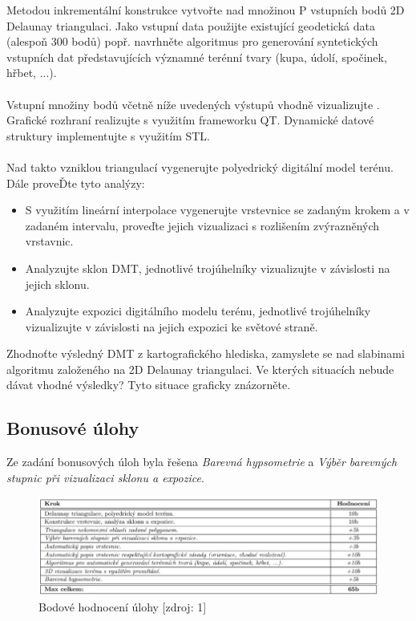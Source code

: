 \documentclass[a4paper, 12pt]{article}
\begin{document}
Metodou inkrementální konstrukce vytvořte nad množinou P vstupních bodů 2D Delaunay triangulaci. Jako vstupní data použijte existující geodetická data (alespoň 300 bodů) popř. navrhněte algoritmus pro generování syntetických vstupních dat představujících významné terénní tvary (kupa, údolí, spočinek, hřbet, ...).\\
\\
Vstupní množiny bodů včetně níže uvedených výstupů vhodně vizualizujte . Grafické rozhraní realizujte s využitím frameworku QT. Dynamické datové struktury implementujte s využitím STL. \\
\\
Nad takto vzniklou triangulací vygenerujte polyedrický digitální model terénu. Dále proveĎte tyto analýzy:
\\
\begin{itemize}
  \item S využitím lineární interpolace vygenerujte vrstevnice se zadaným krokem a v zadaném intervalu, proveďte jejich vizualizaci s rozlišením zvýrazněných vrstavnic.
  \item Analyzujte sklon DMT, jednotlivé trojúhelníky vizualizujte v závislosti na jejich sklonu.
  \item Analyzujte expozici digitálního modelu terénu, jednotlivé trojúhelníky vizualizujte v závislosti na jejich expozici ke světové straně. 
\end{itemize}

Zhodnoťte výsledný DMT z kartografického hlediska, zamyslete se nad slabinami algoritmu založeného na 2D Delaunay triangulaci. Ve kterých situacích nebude dávat vhodné výsledky? Tyto situace graficky znázorněte. \\

\subsection{Bonusové úlohy}

Ze zadání bonusových úloh byla řešena \textit{Barevná hypsometrie} a \textit{Výběr barevných stupnic při vizualizaci sklonu a expozice}.  
\begin{figure}[h!]
	\centering
	\includegraphics[width=15cm]{hodnoceni.jpg}
	\caption{Bodové hodnocení úlohy [zdroj: 1]}
\end{figure}
\end{document}
